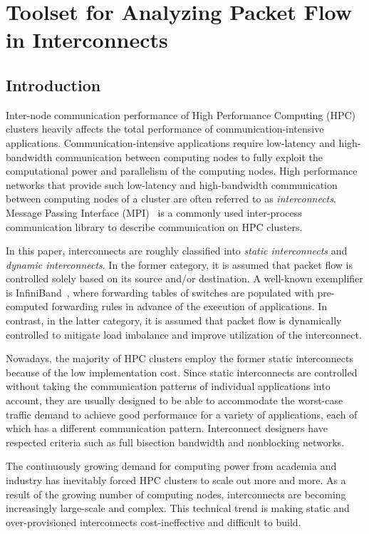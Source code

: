 \chapter{Toolset for Analyzing Packet Flow in Interconnects}

\section{Introduction}\label{ii-introduction}

Inter-node communication performance of High Performance Computing (HPC)
clusters heavily affects the total performance of
communication-intensive applications. Communication-intensive
applications require low-latency and high-bandwidth communication
between computing nodes to fully exploit the computational power and
parallelism of the computing nodes. High performance networks that
provide such low-latency and high-bandwidth communication between
computing nodes of a cluster are often referred to as
\emph{interconnects}. Message Passing Interface
(MPI)~\autocites{MessagePassingInterfaceForum2015}{Gropp2014} is a
commonly used inter-process communication library to describe
communication on HPC clusters.

In this paper, interconnects are roughly classified into \emph{static
interconnects} and \emph{dynamic interconnects}. In the former category,
it is assumed that packet flow is controlled solely based on its source
and/or destination. A well-known exemplifier is
InfiniBand~\autocite{InfiniBand2015}, where forwarding tables of
switches are populated with pre-computed forwarding rules in advance of
the execution of applications. In contrast, in the latter category, it
is assumed that packet flow is dynamically controlled to mitigate load
imbalance and improve utilization of the interconnect.

Nowadays, the majority of HPC clusters employ the former static
interconnects because of the low implementation cost. Since static
interconnects are controlled without taking the communication patterns
of individual applications into account, they are usually designed to be
able to accommodate the worst-case traffic demand to achieve good
performance for a variety of applications, each of which has a different
communication pattern. Interconnect designers have respected criteria
such as full bisection bandwidth and nonblocking networks.

The continuously growing demand for computing power from academia and
industry has inevitably forced HPC clusters to scale out more and more.
As a result of the growing number of computing nodes, interconnects are
becoming increasingly large-scale and complex. This technical trend is
making static and over-provisioned interconnects cost-ineffective and
difficult to build.

